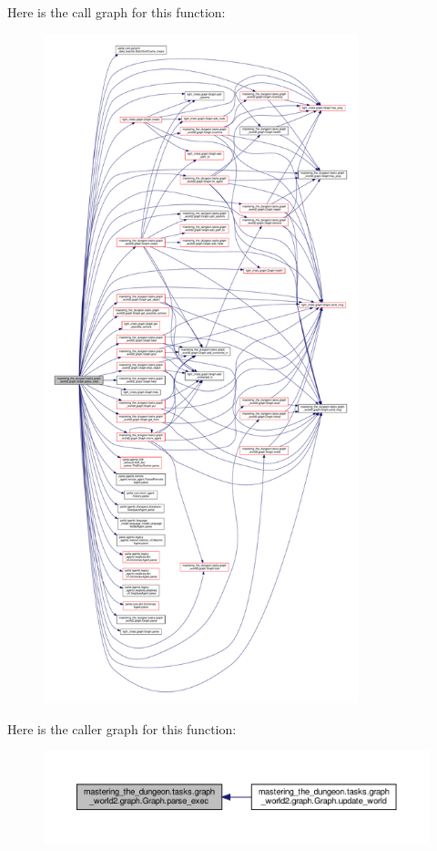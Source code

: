 Here is the call graph for this function\+:
\nopagebreak
\begin{figure}[H]
\begin{center}
\leavevmode
\includegraphics[height=550pt]{classmastering__the__dungeon_1_1tasks_1_1graph__world2_1_1graph_1_1Graph_a3e15de765a5c825f15f66737b2e9118e_cgraph}
\end{center}
\end{figure}
Here is the caller graph for this function\+:
\nopagebreak
\begin{figure}[H]
\begin{center}
\leavevmode
\includegraphics[width=350pt]{classmastering__the__dungeon_1_1tasks_1_1graph__world2_1_1graph_1_1Graph_a3e15de765a5c825f15f66737b2e9118e_icgraph}
\end{center}
\end{figure}
